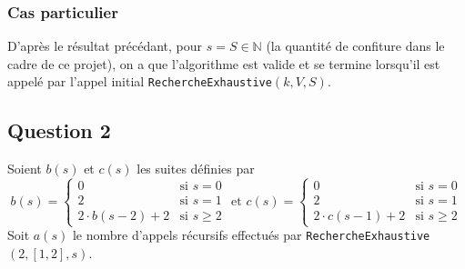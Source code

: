 \documentclass[12pt,a4paper]{article}
\begin{document}
\subsubsection*{Cas particulier}
D'apr\`es le r\'esultat pr\'ec\'edant, pour $s = S \in \mathbb{N}$ (la quantit\'e de confiture dans le cadre de ce projet), on a que l'algorithme est valide et se termine lorsqu'il est appel\'e par l'appel initial \texttt{RechercheExhaustive}$(k,V,S)$. 

\subsection*{Question 2}
Soient $b(s)$ et $c(s)$ les suites d\'efinies par
\begin{equation*}
\left .b(s) = \begin{cases} 
      0 & \text{si } s = 0 \\
      2 & \text{si } s = 1 \\
      2\cdot b(s-2) + 2 & \text{si } s\geq 2 
   \end{cases} \right.
   \text{ et }
\left .c(s) = \begin{cases} 
      0 & \text{si } s = 0 \\
      2 & \text{si } s = 1 \\
      2\cdot c(s-1) + 2 & \text{si } s\geq 2 
   \end{cases} \right.
\end{equation*}
Soit $a(s)$ le nombre d'appels r\'ecursifs effectu\'es par \texttt{RechercheExhaustive}$(2,[1,2],s)$.
\end{document}
